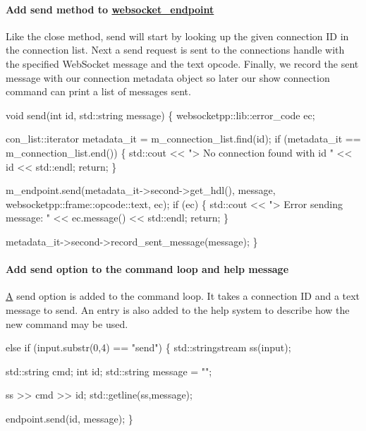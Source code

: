 \paragraph*{Add send method to {\ttfamily \mbox{\hyperlink{classwebsocket__endpoint}{websocket\+\_\+endpoint}}}}

Like the close method, send will start by looking up the given connection ID in the connection list. Next a send request is sent to the connection\textquotesingle{}s handle with the specified Web\+Socket message and the text opcode. Finally, we record the sent message with our connection metadata object so later our show connection command can print a list of messages sent.


\begin{DoxyCode}
\textcolor{keywordtype}{void} send(\textcolor{keywordtype}{int} \textcolor{keywordtype}{id}, std::string message) \{
    websocketpp::lib::error\_code ec;

    con\_list::iterator metadata\_it = m\_connection\_list.find(\textcolor{keywordtype}{id});
    \textcolor{keywordflow}{if} (metadata\_it == m\_connection\_list.end()) \{
        std::cout << \textcolor{stringliteral}{"> No connection found with id "} << \textcolor{keywordtype}{id} << std::endl;
        \textcolor{keywordflow}{return};
    \}

    m\_endpoint.send(metadata\_it->second->get\_hdl(), message, websocketpp::frame::opcode::text, ec);
    \textcolor{keywordflow}{if} (ec) \{
        std::cout << \textcolor{stringliteral}{"> Error sending message: "} << ec.message() << std::endl;
        \textcolor{keywordflow}{return};
    \}

    metadata\_it->second->record\_sent\_message(message);
\}
\end{DoxyCode}


\paragraph*{Add send option to the command loop and help message}

\mbox{\hyperlink{struct_a}{A}} send option is added to the command loop. It takes a connection ID and a text message to send. An entry is also added to the help system to describe how the new command may be used.


\begin{DoxyCode}
\textcolor{keywordflow}{else} \textcolor{keywordflow}{if} (input.substr(0,4) == \textcolor{stringliteral}{"send"}) \{
    std::stringstream ss(input);

        std::string cmd;
        \textcolor{keywordtype}{int} id;
        std::string message = \textcolor{stringliteral}{""};

        ss >> cmd >> id;
        std::getline(ss,message);

        endpoint.send(\textcolor{keywordtype}{id}, message);
\}
\end{DoxyCode}


